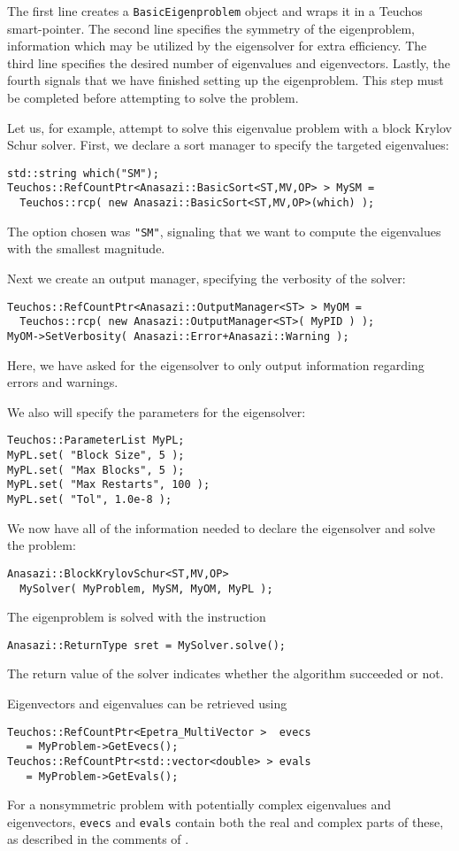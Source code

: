 The first line creates a \verb!BasicEigenproblem! object and wraps it
in a Teuchos smart-pointer. The second line specifies the symmetry of
the eigenproblem, information which may be utilized by the eigensolver
for extra efficiency. The third line specifies the desired number of
eigenvalues and eigenvectors. Lastly, the fourth signals that we have
finished setting up the eigenproblem. This step must be completed
before attempting to solve the problem.

Let us, for example, attempt to solve this eigenvalue problem with a
block Krylov Schur solver. First, we declare a sort manager to specify the
targeted eigenvalues:
\begin{verbatim}
std::string which("SM");
Teuchos::RefCountPtr<Anasazi::BasicSort<ST,MV,OP> > MySM =
  Teuchos::rcp( new Anasazi::BasicSort<ST,MV,OP>(which) );
\end{verbatim}
The option chosen was \verb!"SM"!, signaling that we want to compute
the eigenvalues with the smallest magnitude. 

Next we create an output manager, specifying the verbosity of the
solver:
\begin{verbatim}
Teuchos::RefCountPtr<Anasazi::OutputManager<ST> > MyOM = 
  Teuchos::rcp( new Anasazi::OutputManager<ST>( MyPID ) );
MyOM->SetVerbosity( Anasazi::Error+Anasazi::Warning );
\end{verbatim}
Here, we have asked for the eigensolver to only output information regarding
errors and warnings.

We also will specify the parameters for the eigensolver:
\begin{verbatim}
Teuchos::ParameterList MyPL;
MyPL.set( "Block Size", 5 );
MyPL.set( "Max Blocks", 5 );
MyPL.set( "Max Restarts", 100 );
MyPL.set( "Tol", 1.0e-8 );
\end{verbatim}

We now have all of the information needed to declare the eigensolver
and solve the problem:
\begin{verbatim}
Anasazi::BlockKrylovSchur<ST,MV,OP> 
  MySolver( MyProblem, MySM, MyOM, MyPL );
\end{verbatim}
The eigenproblem is solved with the instruction
\begin{verbatim}
Anasazi::ReturnType sret = MySolver.solve();
\end{verbatim}
The return value of the solver indicates whether the algorithm
succeeded or not. 

Eigenvectors and eigenvalues can be retrieved using
\begin{verbatim}
Teuchos::RefCountPtr<Epetra_MultiVector >  evecs 
   = MyProblem->GetEvecs();
Teuchos::RefCountPtr<std::vector<double> > evals 
   = MyProblem->GetEvals();
\end{verbatim}
For a nonsymmetric problem with potentially complex eigenvalues and
eigenvectors, \verb!evecs! and \verb!evals! contain both the real and
complex parts of these, as described in the comments of
.

